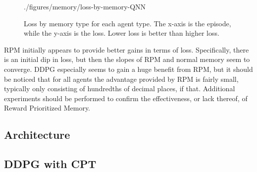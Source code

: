 \begin{figure}[!ht]
    {./figures/memory/loss-by-memory-QNN}
    \caption{
        Loss by memory type for each agent type.
        The x-axis is the episode, while the y-axis is the loss.
        Lower loss is better than higher loss.
    }
    \label{fig:loss-by-memory}
\end{figure}

RPM initially appears to provide better gains in terms of loss.
Specifically, there is an initial dip in loss, but then the slopes of RPM and normal
memory seem to converge.
DDPG especially seems to gain a huge benefit from RPM, but it should be noticed that
for all agents the advantage provided by RPM is fairly small, typically only
consisting of hundredths of decimal places, if that.
Additional experiments should be performed to confirm the effectiveness, or lack
thereof, of Reward Prioritized Memory.

\subsection{Architecture}\label{subsec:architecture}

\subsection{DDPG with CPT}\label{subsec:ddpg-with-cpt}
